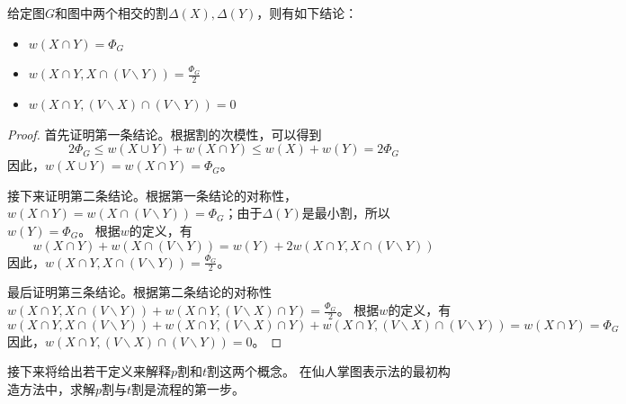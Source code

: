 \begin{lemma}[次模性推论]
  给定图$G$和图中两个相交的割$\Delta(X),\Delta(Y)$，则有如下结论：
  \begin{itemize}
    \item $w(X\cap Y)=\Phi_G$
    \item $w(X\cap Y,X\cap (V\backslash Y))=\frac {\Phi_G}2$
    \item $w(X\cap Y,(V\backslash X)\cap (V\backslash Y))=0$
  \end{itemize}
\end{lemma}
\begin{proof}
  首先证明第一条结论。根据割的次模性，可以得到
  \begin{equation}
    2\Phi_G\leq w(X\cup Y)+w(X\cap Y)\leq w(X)+w(Y) = 2\Phi_G
  \end{equation}
  因此，$w(X\cup Y)=w(X\cap Y)=\Phi_G$。

  接下来证明第二条结论。根据第一条结论的对称性，
  $w(X\cap Y)=w(X\cap (V\backslash Y))=\Phi_G$；由于$\Delta(Y)$是最小割，所以$w(Y)=\Phi_G$。
  根据$w$的定义，有
  \begin{equation}
    w(X\cap Y)+w(X\cap (V\backslash Y))=w(Y)+2w(X\cap Y,X\cap (V\backslash Y))
  \end{equation}
  因此，$w(X\cap Y,X\cap (V\backslash Y))=\frac {\Phi_G}2$。

  最后证明第三条结论。根据第二条结论的对称性$ w(X\cap Y,X\cap (V\backslash Y))+w(X\cap Y,(V\backslash X)\cap Y)=\frac{\Phi_G}2$。
  根据$w$的定义，有
  \begin{equation}
    w(X\cap Y,X\cap (V\backslash Y))+w(X\cap Y,(V\backslash X)\cap Y)+w(X\cap Y,(V\backslash X)\cap (V\backslash Y))=w(X\cap Y)=\Phi_G
  \end{equation}
  因此，$w(X\cap Y,(V\backslash X)\cap (V\backslash Y))=0$。
\end{proof}

接下来将给出若干定义来解释$p$割和$t$割这两个概念。
在仙人掌图表示法的最初构造方法中，求解$p$割与$t$割是流程的第一步。

